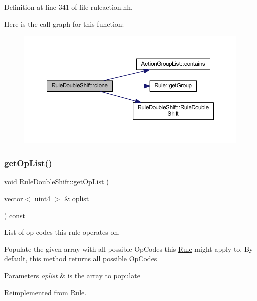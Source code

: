 Definition at line 341 of file ruleaction.\+hh.

Here is the call graph for this function\+:
\nopagebreak
\begin{figure}[H]
\begin{center}
\leavevmode
\includegraphics[width=350pt]{class_rule_double_shift_a0ce602237ed14729b9365571e0b7e47f_cgraph}
\end{center}
\end{figure}
\mbox{\label{class_rule_double_shift_a8fcab09748545ba2622103fbca5c0d04}} 
\subsubsection{\texorpdfstring{getOpList()}{getOpList()}}
{\footnotesize\ttfamily void Rule\+Double\+Shift\+::get\+Op\+List (\begin{DoxyParamCaption}\item[{vector$<$ uint4 $>$ \&}]{oplist }\end{DoxyParamCaption}) const\hspace{0.3cm}{\ttfamily [virtual]}}



List of op codes this rule operates on. 

Populate the given array with all possible Op\+Codes this \mbox{\hyperlink{class_rule}{Rule}} might apply to. By default, this method returns all possible Op\+Codes 
\begin{DoxyParams}{Parameters}
{\em oplist} & is the array to populate \\
\hline
\end{DoxyParams}


Reimplemented from \mbox{\hyperlink{class_rule_a4023bfc7825de0ab866790551856d10e}{Rule}}.



